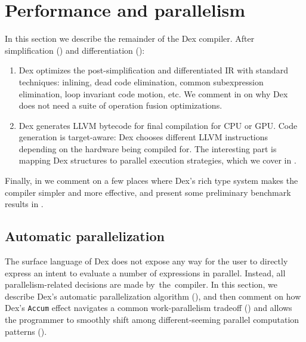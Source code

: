 \documentclass[acmsmall,screen,nonacm]{acmart}
\begin{document}


\section{Performance and parallelism}
\label{sec:performance}

In this section we describe the remainder of the Dex compiler.  After simplification () and differentiation ():
\begin{enumerate}
\item Dex optimizes the post-simplification and differentiated IR with standard techniques: inlining, dead code elimination, common subexpression elimination, loop invariant code motion, etc. We comment in  on why Dex does not need a suite of operation fusion optimizations.
\item Dex generates LLVM bytecode for final compilation for CPU or GPU.
Code generation is target-aware: Dex chooses different LLVM instructions depending on the hardware being compiled for.
The interesting part is mapping Dex structures to parallel execution strategies, which we cover in .
\end{enumerate}
Finally, in  we comment on a few places where Dex's rich type system makes the compiler simpler and more effective, and present some preliminary benchmark results in .


\subsection{Automatic parallelization}
\label{sec:auto-parallel}

The surface language of Dex does not expose any way for the user to directly express an intent to evaluate a number of expressions in parallel.
Instead, all parallelism-related decisions are made by~the~compiler.
In this section, we describe Dex's automatic parallelization algorithm (), and then comment on how Dex's \verb|Accum| effect navigates a common work-parallelism tradeoff () and allows the programmer to smoothly shift among different-seeming parallel computation patterns ().
\end{document}
